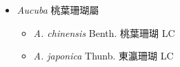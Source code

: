 
  \begin{itemize}
 \item[] \textit{Aucuba} 桃葉珊瑚屬
                                
  \begin{itemize}
        \item[] \textit{A. chinensis} Benth.  桃葉珊瑚   LC
        \item[] \textit{A. japonica} Thunb.  東瀛珊瑚   LC
  \end{itemize}
  \end{itemize}

